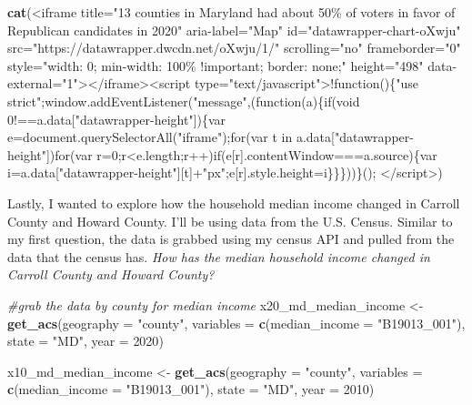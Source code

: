 \documentclass[
]{article}
\newenvironment{Shaded}{\begin{snugshade}}{\end{snugshade}}
\newcommand{\AttributeTok}[1]{\textcolor[rgb]{0.13,0.29,0.53}{#1}}
\newcommand{\CommentTok}[1]{\textcolor[rgb]{0.56,0.35,0.01}{\textit{#1}}}
\newcommand{\DecValTok}[1]{\textcolor[rgb]{0.00,0.00,0.81}{#1}}
\newcommand{\FunctionTok}[1]{\textcolor[rgb]{0.13,0.29,0.53}{\textbf{#1}}}
\newcommand{\NormalTok}[1]{#1}
\newcommand{\OtherTok}[1]{\textcolor[rgb]{0.56,0.35,0.01}{#1}}
\newcommand{\StringTok}[1]{\textcolor[rgb]{0.31,0.60,0.02}{#1}}
\begin{document}
\begin{Shaded}
\begin{Highlighting}[]
\FunctionTok{cat}\NormalTok{(}\StringTok{\textquotesingle{}\textless{}iframe title="13 counties in Maryland had about 50\% of voters in favor of Republican candidates in 2020" aria{-}label="Map" id="datawrapper{-}chart{-}oXwju" src="https://datawrapper.dwcdn.net/oXwju/1/" scrolling="no" frameborder="0" style="width: 0; min{-}width: 100\% !important; border: none;" height="498" data{-}external="1"\textgreater{}\textless{}/iframe\textgreater{}\textless{}script type="text/javascript"\textgreater{}!function()\{"use strict";window.addEventListener("message",(function(a)\{if(void 0!==a.data["datawrapper{-}height"])\{var e=document.querySelectorAll("iframe");for(var t in a.data["datawrapper{-}height"])for(var r=0;r\textless{}e.length;r++)if(e[r].contentWindow===a.source)\{var i=a.data["datawrapper{-}height"][t]+"px";e[r].style.height=i\}\}\}))\}();}
\StringTok{\textless{}/script\textgreater{}\textquotesingle{}}\NormalTok{)}
\end{Highlighting}
\end{Shaded}

Lastly, I wanted to explore how the household median income changed in
Carroll County and Howard County. I'll be using data from the U.S.
Census. Similar to my first question, the data is grabbed using my
census API and pulled from the data that the census has. \emph{How has
the median household income changed in Carroll County and Howard
County?}

\begin{Shaded}
\begin{Highlighting}[]
\CommentTok{\#grab the data by county for median income}
\NormalTok{x20\_md\_median\_income }\OtherTok{\textless{}{-}} \FunctionTok{get\_acs}\NormalTok{(}\AttributeTok{geography =} \StringTok{"county"}\NormalTok{,}
              \AttributeTok{variables =} \FunctionTok{c}\NormalTok{(}\AttributeTok{median\_income =} \StringTok{"B19013\_001"}\NormalTok{),}
              \AttributeTok{state =} \StringTok{"MD"}\NormalTok{,}
              \AttributeTok{year =} \DecValTok{2020}\NormalTok{) }

\NormalTok{x10\_md\_median\_income }\OtherTok{\textless{}{-}} \FunctionTok{get\_acs}\NormalTok{(}\AttributeTok{geography =} \StringTok{"county"}\NormalTok{,}
              \AttributeTok{variables =} \FunctionTok{c}\NormalTok{(}\AttributeTok{median\_income =} \StringTok{"B19013\_001"}\NormalTok{),}
              \AttributeTok{state =} \StringTok{"MD"}\NormalTok{,}
              \AttributeTok{year =} \DecValTok{2010}\NormalTok{)}
\end{Highlighting}
\end{Shaded}
\end{document}
